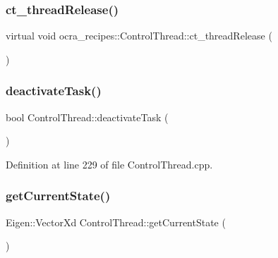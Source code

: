 \hypertarget{classocra__recipes_1_1ControlThread_ade246d31ff5f81978e3920b7fb1b6abb}{}\label{classocra__recipes_1_1ControlThread_ade246d31ff5f81978e3920b7fb1b6abb} 
\subsubsection{\texorpdfstring{ct\+\_\+thread\+Release()}{ct\_threadRelease()}}
{\footnotesize\ttfamily virtual void ocra\+\_\+recipes\+::\+Control\+Thread\+::ct\+\_\+thread\+Release (\begin{DoxyParamCaption}{ }\end{DoxyParamCaption})\hspace{0.3cm}{\ttfamily [pure virtual]}}

\hypertarget{classocra__recipes_1_1ControlThread_a994fe44acbacf847cdf5a692c59f347a}{}\label{classocra__recipes_1_1ControlThread_a994fe44acbacf847cdf5a692c59f347a} 
\subsubsection{\texorpdfstring{deactivate\+Task()}{deactivateTask()}}
{\footnotesize\ttfamily bool Control\+Thread\+::deactivate\+Task (\begin{DoxyParamCaption}{ }\end{DoxyParamCaption})}



Definition at line 229 of file Control\+Thread.\+cpp.

\hypertarget{classocra__recipes_1_1ControlThread_abcb1ddc1f244b60899c028bb16b4cc07}{}\label{classocra__recipes_1_1ControlThread_abcb1ddc1f244b60899c028bb16b4cc07} 
\subsubsection{\texorpdfstring{get\+Current\+State()}{getCurrentState()}}
{\footnotesize\ttfamily Eigen\+::\+Vector\+Xd Control\+Thread\+::get\+Current\+State (\begin{DoxyParamCaption}{ }\end{DoxyParamCaption})\hspace{0.3cm}{\ttfamily [protected]}}



